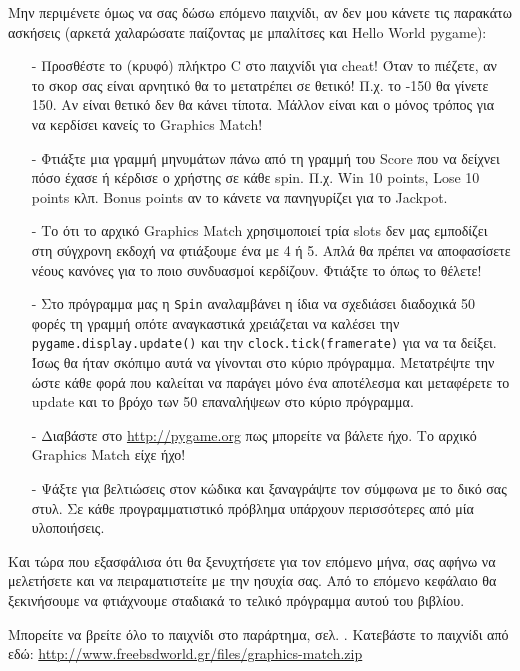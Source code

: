 Μην περιμένετε όμως να σας δώσω επόμενο παιχνίδι, αν δεν μου κάνετε τις παρακάτω ασκήσεις (αρκετά χαλαρώσατε παίζοντας με μπαλίτσες και Hello World pygame):
%
\begin{enumerate}
\item[-]  Προσθέστε το (κρυφό) πλήκτρο C στο παιχνίδι για cheat! Όταν το πιέζετε, αν το σκορ σας είναι αρνητικό θα το μετατρέπει σε θετικό! Π.χ. το -150 θα γίνετε 150. Αν είναι θετικό δεν θα κάνει τίποτα. Μάλλον είναι και ο μόνος τρόπος για να κερδίσει κανείς το Graphics Match!
\item[-] Φτιάξτε μια γραμμή μηνυμάτων πάνω από τη γραμμή του Score που να δείχνει πόσο έχασε ή κέρδισε ο χρήστης σε κάθε spin. Π.χ. Win 10 points, Lose 10 points κλπ. Bonus points αν το κάνετε να πανηγυρίζει για το Jackpot.
\item[-] Το ότι το αρχικό Graphics Match χρησιμοποιεί τρία slots δεν μας εμποδίζει στη σύγχρονη εκδοχή να φτιάξουμε ένα με 4 ή 5. Απλά θα πρέπει να αποφασίσετε νέους κανόνες για το ποιο συνδυασμοί κερδίζουν. Φτιάξτε το όπως το θέλετε!
\item[-] Στο πρόγραμμα μας η {\tt Spin} αναλαμβάνει η ίδια να σχεδιάσει
διαδοχικά 50 φορές τη γραμμή οπότε αναγκαστικά χρειάζεται να καλέσει την
{\tt pygame.display.update()} και την {\tt clock.tick(framerate)} για να τα δείξει. Ίσως θα ήταν σκόπιμο αυτά να γίνονται στο κύριο πρόγραμμα. Μετατρέψτε την ώστε κάθε φορά που καλείται να παράγει μόνο ένα αποτέλεσμα και μεταφέρετε το update και το βρόχο των 50 επαναλήψεων στο κύριο πρόγραμμα.
\item[-] Διαβάστε στο \url{http://pygame.org} πως μπορείτε να βάλετε ήχο. Το αρχικό Graphics Match είχε ήχο!
\item[-] Ψάξτε για βελτιώσεις στον κώδικα και ξαναγράψτε τον σύμφωνα με το δικό σας στυλ. Σε κάθε προγραμματιστικό πρόβλημα υπάρχουν περισσότερες από μία υλοποιήσεις.
\end{enumerate}
%
Και τώρα που εξασφάλισα ότι θα ξενυχτήσετε για τον επόμενο μήνα, σας αφήνω
να μελετήσετε και να πειραματιστείτε με την ησυχία σας. Από το επόμενο
κεφάλαιο θα ξεκινήσουμε να φτιάχνουμε σταδιακά το τελικό πρόγραμμα αυτού του
βιβλίου.

Μπορείτε να βρείτε όλο το παιχνίδι στο παράρτημα, σελ. \pageref{listing:graphics-match}.  Κατεβάστε το παιχνίδι από εδώ: \url{http://www.freebsdworld.gr/files/graphics-match.zip}
